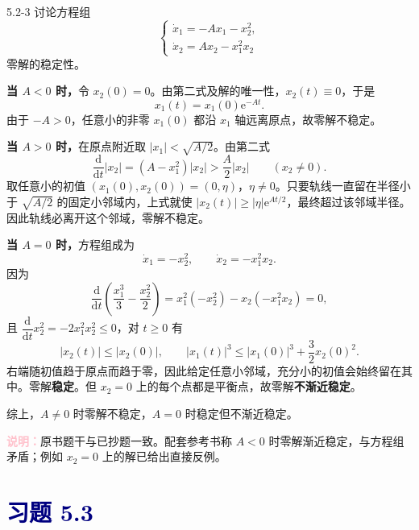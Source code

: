 \documentclass[UTF8,a4paper,11pt]{ctexart}
\newcommand{\e}{\mathrm e}
\newcommand{\note}[1]{\par\smallskip\noindent\textcolor{pink}{\bfseries 说明：}#1\par\smallskip}
\newcommand{\sect}[1]{\section*{\textcolor{navy}{习题 #1}}}
\begin{document}
\begin{problem}{5.2-3}
讨论方程组
\[
\begin{cases}
\dot{x}_1=-Ax_1-x_2^2,\\
\dot{x}_2=Ax_2-x_1^2x_2
\end{cases}
\]
零解的稳定性。
\end{problem}
\begin{solution}
\textbf{当 $A<0$ 时，}令 $x_2(0)=0$。由第二式及解的唯一性，$x_2(t)\equiv0$，于是
\[
x_1(t)=x_1(0)\e^{-At}.
\]
由于 $-A>0$，任意小的非零 $x_1(0)$ 都沿 $x_1$ 轴远离原点，故零解不稳定。

\textbf{当 $A>0$ 时，}在原点附近取 $|x_1|<\sqrt{A/2}$。由第二式
\[
\frac{\mathrm d}{\mathrm dt}|x_2|
=(A-x_1^2)|x_2|
>\frac A2|x_2|\qquad(x_2\ne0).
\]
取任意小的初值 $(x_1(0),x_2(0))=(0,\eta)$，$\eta\ne0$。只要轨线一直留在半径小于 $\sqrt{A/2}$ 的固定小邻域内，上式就使 $|x_2(t)|\ge|\eta|\e^{At/2}$，最终超过该邻域半径。因此轨线必离开这个邻域，零解不稳定。

\textbf{当 $A=0$ 时，}方程组成为
\[
\dot x_1=-x_2^2,\qquad \dot x_2=-x_1^2x_2.
\]
因为
\[
\frac{\mathrm d}{\mathrm dt}
\left(\frac{x_1^3}{3}-\frac{x_2^2}{2}\right)
=x_1^2(-x_2^2)-x_2(-x_1^2x_2)=0,
\]
且 $\dfrac{\mathrm d}{\mathrm dt}x_2^2=-2x_1^2x_2^2\le0$，对 $t\ge0$ 有
\[
|x_2(t)|\le |x_2(0)|,\qquad
|x_1(t)|^3\le |x_1(0)|^3+\frac32x_2(0)^2.
\]
右端随初值趋于原点而趋于零，因此给定任意小邻域，充分小的初值会始终留在其中。零解\textbf{稳定}。但 $x_2=0$ 上的每个点都是平衡点，故零解\textbf{不渐近稳定}。

综上，$A\ne0$ 时零解不稳定，$A=0$ 时稳定但不渐近稳定。
\note{原书题干与已抄题一致。配套参考书称 $A<0$ 时零解渐近稳定，与方程组矛盾；例如 $x_2=0$ 上的解已给出直接反例。}
\end{solution}

\sect{5.3}
\end{document}
